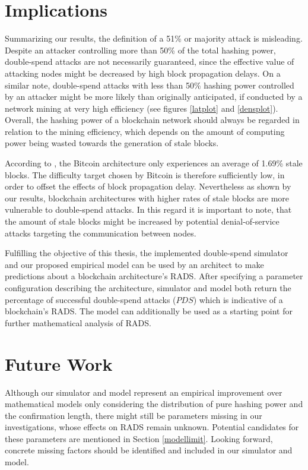 \documentclass[a4paper,12pt,twoside]{report}
\begin{document}
\section{Implications}
Summarizing our results, the definition of a 51\% or majority attack is misleading. Despite an attacker controlling more than 50\% of the total hashing power, double-spend attacks are not necessarily guaranteed, since the effective value of attacking nodes might be decreased by high block propagation delays. On a similar note, double-spend attacks with less than 50\% hashing power controlled by an attacker might be more likely than originally anticipated, if conducted by a network mining at very high efficiency (see figures \ref{latplot} and \ref{densplot}). Overall, the hashing power of a blockchain network should always be regarded in relation to the mining efficiency, which depends on the amount of computing power being wasted towards the generation of stale blocks.

According to \cite{infoprop}, the Bitcoin architecture only experiences an average of 1.69\% stale blocks. The difficulty target chosen by Bitcoin is therefore sufficiently low, in order to offset the effects of block propagation delay. Nevertheless as shown by our results, blockchain architectures with higher rates of stale blocks are more vulnerable to double-spend attacks. In this regard it is important to note, that the amount of stale blocks might be increased by potential denial-of-service attacks targeting the communication between nodes.

Fulfilling the objective of this thesis, the implemented double-spend simulator and our proposed empirical model can be used by an architect to make predictions about a blockchain architecture's RADS. After specifying a parameter configuration describing the architecture, simulator and model both return the percentage of successful double-spend attacks ($PDS$) which is indicative of a blockchain's RADS. The model can additionally be used as a starting point for further mathematical analysis of RADS.
\section{Future Work}
Although our simulator and model represent an empirical improvement over mathematical models only considering the distribution of pure hashing power and the confirmation length, there might still be parameters missing in our investigations, whose effects on RADS remain unknown. Potential candidates for these parameters are mentioned in Section \ref{modellimit}. Looking forward, concrete missing factors should be identified and included in our simulator and model.
\end{document}
